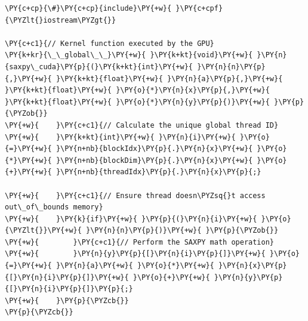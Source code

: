 \begin{Verbatim}[label=\makebox{\url{https://github.com/lucabaldini/cmepda/tree/master/slides/latex/snippets/cuda_saxpy.cu}},commandchars=\\\{\}]
\PY{c+cp}{\#}\PY{c+cp}{include}\PY{+w}{ }\PY{c+cpf}{\PYZlt{}iostream\PYZgt{}}

\PY{c+c1}{// Kernel function executed by the GPU}
\PY{k+kr}{\_\_global\_\_}\PY{+w}{ }\PY{k+kt}{void}\PY{+w}{ }\PY{n}{saxpy\_cuda}\PY{p}{(}\PY{k+kt}{int}\PY{+w}{ }\PY{n}{n}\PY{p}{,}\PY{+w}{ }\PY{k+kt}{float}\PY{+w}{ }\PY{n}{a}\PY{p}{,}\PY{+w}{ }\PY{k+kt}{float}\PY{+w}{ }\PY{o}{*}\PY{n}{x}\PY{p}{,}\PY{+w}{ }\PY{k+kt}{float}\PY{+w}{ }\PY{o}{*}\PY{n}{y}\PY{p}{)}\PY{+w}{ }\PY{p}{\PYZob{}}
\PY{+w}{    }\PY{c+c1}{// Calculate the unique global thread ID}
\PY{+w}{    }\PY{k+kt}{int}\PY{+w}{ }\PY{n}{i}\PY{+w}{ }\PY{o}{=}\PY{+w}{ }\PY{n+nb}{blockIdx}\PY{p}{.}\PY{n}{x}\PY{+w}{ }\PY{o}{*}\PY{+w}{ }\PY{n+nb}{blockDim}\PY{p}{.}\PY{n}{x}\PY{+w}{ }\PY{o}{+}\PY{+w}{ }\PY{n+nb}{threadIdx}\PY{p}{.}\PY{n}{x}\PY{p}{;}

\PY{+w}{    }\PY{c+c1}{// Ensure thread doesn\PYZsq{}t access out\_of\_bounds memory}
\PY{+w}{    }\PY{k}{if}\PY{+w}{ }\PY{p}{(}\PY{n}{i}\PY{+w}{ }\PY{o}{\PYZlt{}}\PY{+w}{ }\PY{n}{n}\PY{p}{)}\PY{+w}{ }\PY{p}{\PYZob{}}
\PY{+w}{        }\PY{c+c1}{// Perform the SAXPY math operation}
\PY{+w}{        }\PY{n}{y}\PY{p}{[}\PY{n}{i}\PY{p}{]}\PY{+w}{ }\PY{o}{=}\PY{+w}{ }\PY{n}{a}\PY{+w}{ }\PY{o}{*}\PY{+w}{ }\PY{n}{x}\PY{p}{[}\PY{n}{i}\PY{p}{]}\PY{+w}{ }\PY{o}{+}\PY{+w}{ }\PY{n}{y}\PY{p}{[}\PY{n}{i}\PY{p}{]}\PY{p}{;}
\PY{+w}{    }\PY{p}{\PYZcb{}}
\PY{p}{\PYZcb{}}


\end{Verbatim}
